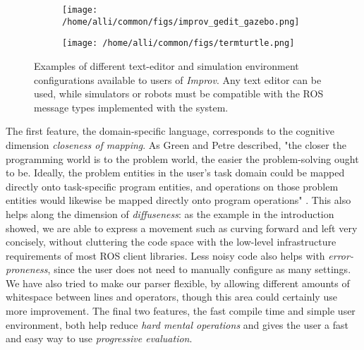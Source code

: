 \documentclass[sigconf]{acmart}
\begin{document}
\begin{figure*}[h!]
    \begin{subfigure}{0.45\textwidth}
        \texttt{[image: /home/alli/common/figs/improv\_gedit\_gazebo.png]}
    \end{subfigure}\hfill%
    \begin{subfigure}{0.45\textwidth}
        \texttt{[image: /home/alli/common/figs/termturtle.png]}
    \end{subfigure}
    \caption{Examples of different text-editor and simulation environment
configurations available to users of \emph{Improv}. Any text editor can be
used, while simulators or robots must be compatible with the ROS message types
implemented with the system.}
\end{figure*}



The first feature, the domain-specific language, corresponds to the cognitive
dimension \emph{closeness of
mapping}. As Green and Petre described, "the closer the programming world is to
the problem world, the easier the problem-solving ought to be. Ideally, the
problem entities in the user's task domain could be mapped directly onto
task-specific program entities, and operations on those problem entities would
likewise be mapped directly onto program operations" \cite{green1996usability}.
This also helps along the dimension of \emph{diffuseness}: as the example in the
introduction showed, we are able to express a movement such as curving forward
and left very concisely, without cluttering the code space with the low-level
infrastructure requirements of most ROS client libraries. Less noisy code also
helps with \emph{error-proneness}, since the user does not need to manually
configure as many settings. We have also tried to make our parser flexible, by
allowing different amounts of whitespace between lines and operators, though
this area could certainly use more improvement. The final two features, the fast
compile time and simple user environment, both help reduce \emph{hard mental
operations} and gives the user a fast and easy way to use \emph{progressive
evaluation}.
\end{document}
